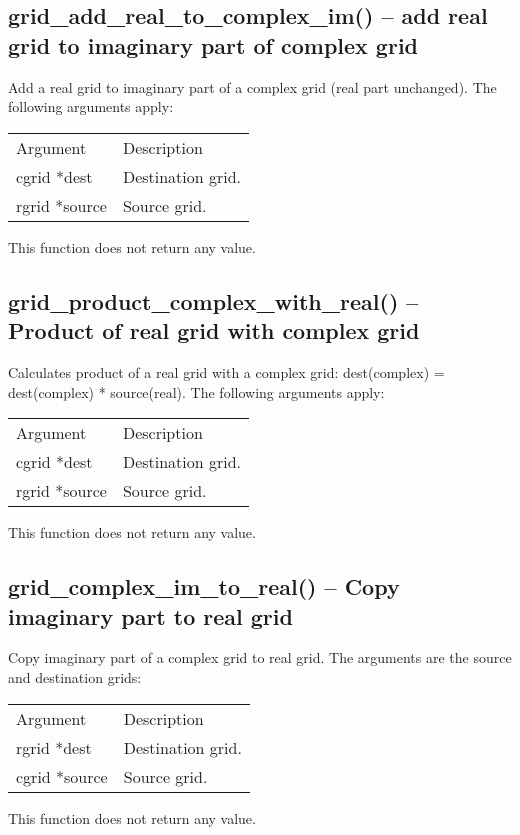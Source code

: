 \documentclass[12pt,letterpaper]{report}
\begin{document}
\subsection{grid\_add\_real\_to\_complex\_im() -- add real grid to imaginary part of complex grid}

Add a real grid to imaginary part of a complex grid (real part unchanged). The following arguments apply:
\begin{longtable}{p{} p{}}
Argument & Description\\
\cline{1-2}
cgrid *dest & Destination grid.\\
rgrid *source & Source grid.\\
\end{longtable}
\noindent
This function does not return any value.

\subsection{grid\_product\_complex\_with\_real() -- Product of real grid with complex grid}

Calculates product of a real grid with a complex grid: dest(complex) = dest(complex) * source(real). The following arguments apply:
\begin{longtable}{p{} p{}}
Argument & Description\\
\cline{1-2}
cgrid *dest & Destination grid.\\
rgrid *source & Source grid.\\
\end{longtable}
\noindent
This function does not return any value.

\subsection{grid\_complex\_im\_to\_real() -- Copy imaginary part to real grid}

Copy imaginary part of a complex grid to real grid. The arguments are the source and destination grids:
\begin{longtable}{p{} p{}}
Argument & Description\\
\cline{1-2}
rgrid *dest & Destination grid.\\
cgrid *source & Source grid.\\
\end{longtable}
\noindent
This function does not return any value.
\end{document}
